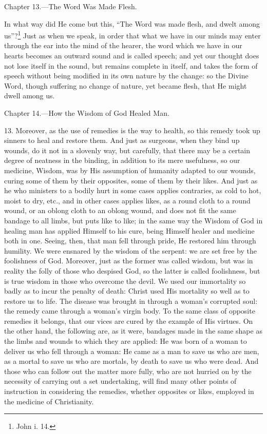 
Chapter 13.—The Word Was Made Flesh.

In what way did He come but this, “The Word was made flesh, and dwelt among us”?\footnote{John i. 14.} Just as when we speak, in order that what we have in our minds may enter through the ear into the mind of the hearer, the word which we have in our hearts becomes an outward sound and is called speech; and yet our thought does not lose itself in the sound, but remains complete in itself, and takes the form of speech without being modified in its own nature by the change: so the Divine Word, though suffering no change of nature, yet became flesh, that He might dwell among us.


Chapter 14.—How the Wisdom of God Healed Man.

13. Moreover, as the use of remedies is the way to health, so this remedy took up sinners to heal and restore them. And just as surgeons, when they bind up wounds, do it not in a slovenly way, but carefully, that there may be a certain degree of neatness in the binding, in addition to its mere usefulness, so our medicine, Wisdom, was by His assumption of humanity adapted to our wounds, curing some of them by their opposites, some of them by their likes. And just as he who ministers to a bodily hurt in some cases applies contraries, as cold to hot, moist to dry, etc., and in other cases applies likes, as a round cloth to a round wound, or an oblong cloth to an oblong wound, and does not fit the same bandage to all limbs, but puts like to like; in the same way the Wisdom of God in healing man has applied Himself to his cure, being Himself healer and medicine both in one. Seeing, then, that man fell through pride, He restored him through humility. We were ensnared by the wisdom of the serpent: we are set free by the foolishness of God. Moreover, just as the former was called wisdom, but was in reality the folly of those who despised God, so the latter is called foolishness, but is true wisdom in those who overcome the devil. We used our immortality so badly as to incur the penalty of death: Christ used His mortality so well as to restore us to life. The disease was brought in through a woman’s corrupted soul: the remedy came through a woman’s virgin body. To the same class of opposite remedies it belongs, that our vices are cured by the example of His virtues. On the other hand, the following are, as it were, bandages made in the same shape as the limbs and wounds to which they are applied: He was born of a woman to deliver us who fell through a woman: He came as a man to save us who are men, as a mortal to save us who are mortals, by death to save us who were dead. And those who can follow out the matter more fully, who are not hurried on by the necessity of carrying out a set undertaking, will find many other points of instruction in considering the remedies, whether opposites or likes, employed in the medicine of Christianity.

